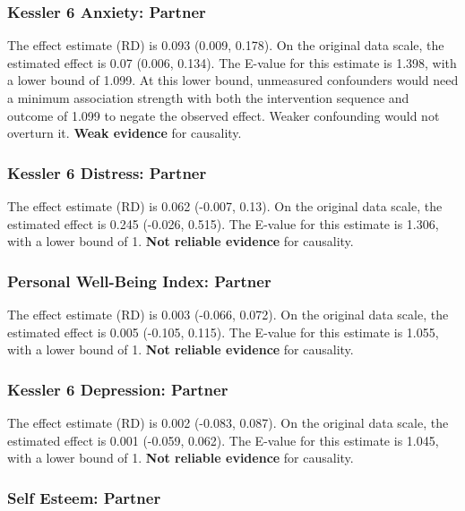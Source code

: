 \documentclass[
  singlecolumn]{article}
\begin{document}
\subsubsection{Kessler 6 Anxiety:
Partner}\label{kessler-6-anxiety-partner-16}

The effect estimate (RD) is 0.093 (0.009, 0.178). On the original data
scale, the estimated effect is 0.07 (0.006, 0.134). The E-value for this
estimate is 1.398, with a lower bound of 1.099. At this lower bound,
unmeasured confounders would need a minimum association strength with
both the intervention sequence and outcome of 1.099 to negate the
observed effect. Weaker confounding would not overturn it. \textbf{Weak
evidence} for causality.

\subsubsection{Kessler 6 Distress:
Partner}\label{kessler-6-distress-partner-16}

The effect estimate (RD) is 0.062 (-0.007, 0.13). On the original data
scale, the estimated effect is 0.245 (-0.026, 0.515). The E-value for
this estimate is 1.306, with a lower bound of 1. \textbf{Not reliable
evidence} for causality.

\subsubsection{Personal Well-Being Index:
Partner}\label{personal-well-being-index-partner-16}

The effect estimate (RD) is 0.003 (-0.066, 0.072). On the original data
scale, the estimated effect is 0.005 (-0.105, 0.115). The E-value for
this estimate is 1.055, with a lower bound of 1. \textbf{Not reliable
evidence} for causality.

\subsubsection{Kessler 6 Depression:
Partner}\label{kessler-6-depression-partner-16}

The effect estimate (RD) is 0.002 (-0.083, 0.087). On the original data
scale, the estimated effect is 0.001 (-0.059, 0.062). The E-value for
this estimate is 1.045, with a lower bound of 1. \textbf{Not reliable
evidence} for causality.

\subsubsection{Self Esteem: Partner}\label{self-esteem-partner-16}
\end{document}

